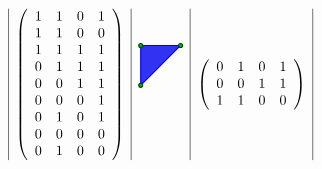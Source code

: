 \documentclass[11pt,a4paper,abstract=yes]{scrartcl}
\theoremstyle{plain}
\begin{document}
\begin{mexample}
\begin{displaymath}
\begin{array}{c|c|c|c|c}
   &
\left(\begin{array}{rrrr}
1 & 1 & 0 & 1 \\
1 & 1 & 0 & 0 \\
1 & 1 & 1 & 1 \\
0 & 1 & 1 & 1 \\
0 & 0 & 1 & 1 \\
0 & 0 & 0 & 1 \\
0 & 1 & 0 & 1 \\
0 & 0 & 0 & 0 \\
0 & 1 & 0 & 0
\end{array}\right)
   &
\begin{tikzpicture}%
	[scale=1.000000,
	back/.style={loosely dotted, thin},
	edge/.style={color=blue!95!black, thick},
	facet/.style={fill=blue!95!black,fill opacity=0.800000},
	vertex/.style={inner sep=1pt,circle,draw=green!25!black,fill=green!75!black,thick}]
%
%
\coordinate (0.00000, 0.00000) at (0.00000, 0.00000);
\coordinate (0.00000, 1.00000) at (0.00000, 1.00000);
\coordinate (1.00000, 1.00000) at (1.00000, 1.00000);
\fill[facet] (1.00000, 1.00000) -- (0.00000, 0.00000) -- (0.00000, 1.00000) -- cycle {};
\draw[edge] (0.00000, 0.00000) -- (0.00000, 1.00000);
\draw[edge] (0.00000, 0.00000) -- (1.00000, 1.00000);
\draw[edge] (0.00000, 1.00000) -- (1.00000, 1.00000);
\node[vertex] at (0.00000, 0.00000)     {};
\node[vertex] at (0.00000, 1.00000)     {};
\node[vertex] at (1.00000, 1.00000)     {};
\end{tikzpicture}
   &
\left(\begin{array}{rrrr}
0 & 1 & 0 & 1 \\
0 & 0 & 1 & 1 \\
1 & 1 & 0 & 0
\end{array}\right)
 \\
\end{array}\end{displaymath}
\end{mexample}
\end{document}

